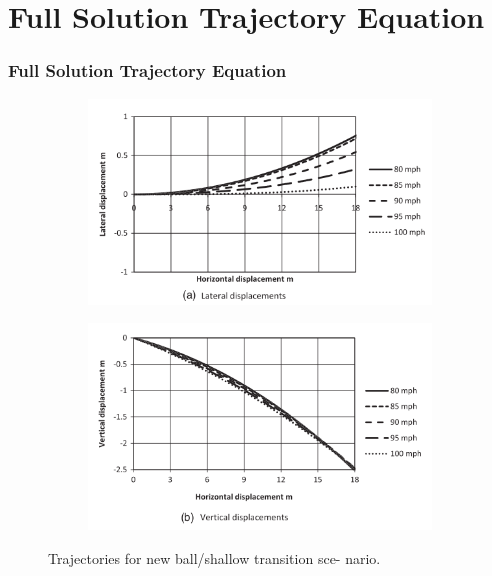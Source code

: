 \documentclass{beamer}
\begin{document}
\section{Full Solution Trajectory Equation}
\begin{frame} 
\frametitle{Full Solution Trajectory Equation}

\begin{figure}[h!]
  \centering
  \begin{subfigure}[b]{0.5\linewidth}
    \includegraphics[width=\linewidth]{./figs/fs_1.png}
  \end{subfigure}
  \begin{subfigure}[b]{0.5\linewidth}
    \includegraphics[width=\linewidth]{./figs/fs_2.png}
  \end{subfigure}
  \caption{Trajectories for new ball/shallow transition sce-
nario.}
  \label{fig:fs12}
\end{figure}
\end{frame}
\end{document}
